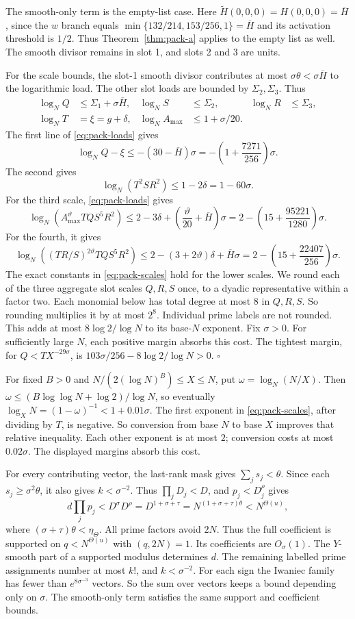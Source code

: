 The smooth-only term is the empty-list case. Here
$\widetilde H(0,0,0)=H(0,0,0)=\overline H$, since the $w$ branch
equals $\min\{132/214,153/256,1\}=\overline H$ and its activation
threshold is $1/2$. Thus Theorem~\ref{thm:pack-a} applies to the empty list as well.
The smooth divisor remains in slot 1, and slots 2 and 3 are units.

For the scale bounds, the slot-1 smooth divisor contributes at most
$\sigma \theta<\sigma\overline H$ to the logarithmic load. The other
slot loads are bounded by $\Sigma_2,\Sigma_3$. Thus
\[
\begin{aligned}
 \log_NQ&\le\Sigma_1+\sigma\overline H,&
 \log_NS&\le\Sigma_2,&
 \log_NR&\le\Sigma_3,\\
 \log_NT&=\xi=g+\delta,&
 \log_NA_{\max}&\le1+\sigma/20.
\end{aligned}
\]
The first line of \eqref{eq:pack-loads} gives
\[
 \log_NQ-\xi\le-(30-\overline H)\sigma
 =-\left(1+\frac{7271}{256}\right)\sigma.
\]
The second gives
\[
 \log_N(T^2SR^2)\le1-2\delta=1-60\sigma.
\]
For the third scale, \eqref{eq:pack-loads} gives
\[
 \log_N(A_{\max}^{\vartheta}TQS^5R^2)
 \le2-3\delta+\left(\frac{\vartheta}{20}+\overline H\right)\sigma
 =2-\left(15+\frac{95221}{1280}\right)\sigma.
\]
For the fourth, it gives
\[
 \log_N((TR/S)^{2\vartheta}TQS^5R^2)
 \le2-(3+2\vartheta)\delta+\overline H\sigma
 =2-\left(15+\frac{22407}{256}\right)\sigma.
\]
The exact constants in \eqref{eq:pack-scales} hold for the lower scales.
We round each of the three aggregate slot scales $Q,R,S$ once, to a
dyadic representative within a factor two. Each monomial below has
total degree at most $8$ in $Q,R,S$. So rounding multiplies it by at
most $2^8$. Individual prime labels are not rounded.
This adds at most
$8\log 2/\log N$ to its base-$N$ exponent. Fix $\sigma>0$. For sufficiently large $N$, each positive margin
absorbs this cost. The tightest margin, for $Q<TX^{-29\sigma}$, is
$103\sigma/256-8\log 2/\log N>0$. \hfill$\square$

For fixed $B>0$ and $N/(2(\log N)^B)\le X\le N$, put
$\omega=\log_N(N/X)$. Then
$\omega\le(B\log\log N+\log2)/\log N$, so eventually
$\log_XN=(1-\omega)^{-1}<1+0.01\sigma$. The first exponent in
\eqref{eq:pack-scales}, after dividing by $T$, is negative. So
conversion from base $N$ to base $X$ improves that relative inequality.
Each other exponent is at most $2$;
conversion costs at most $0.02\sigma$. The displayed margins absorb
this cost.

For every contributing vector, the last-rank mask gives
$\sum_js_j<\theta$. Since each $s_j\ge\sigma^2\theta$, it also gives
$k<\sigma^{-2}$. Thus $\prod_jD_j<D$, and $p_j<D_j^\rho$ gives
\[
 d\prod_jp_j<D^\sigma D^\rho=D^{1+\sigma+\tau}
 =N^{(1+\sigma+\tau)\theta}<N^{\Theta(u)},
\]
where $(\sigma+\tau)\theta<\eta_\Theta$.
All prime factors avoid $2N$. Thus the full coefficient is supported
on $q<N^{\Theta(u)}$ with $(q,2N)=1$. Its coefficients are
$O_\sigma(1)$. The $Y$-smooth part of a supported modulus determines
$d$. The remaining labelled prime assignments number at most $k!$,
and $k<\sigma^{-2}$. For each sign the Iwaniec family has fewer than
$e^{8\sigma^{-3}}$ vectors. So the sum over vectors keeps a bound
depending only on $\sigma$. The smooth-only term satisfies the same
support and coefficient bounds.

